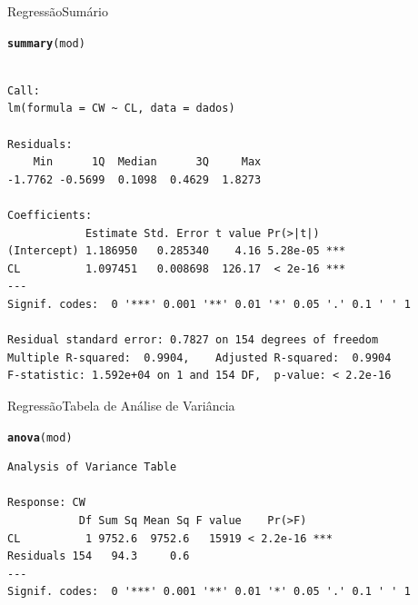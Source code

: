 \documentclass[10pt]{beamer}\usepackage[]{graphicx}\usepackage[]{color}
\makeatletter
\newcommand{\hlstd}[1]{\textcolor[rgb]{0.345,0.345,0.345}{#1}}%
\newcommand{\hlkwd}[1]{\textcolor[rgb]{0.737,0.353,0.396}{\textbf{#1}}}%
\newenvironment{kframe}{%
 \def\at@end@of@kframe{}%
 \ifinner\ifhmode%
  \def\at@end@of@kframe{\end{minipage}}%
  \begin{minipage}{\columnwidth}%
 \fi\fi%
 \def\FrameCommand##1{\hskip\@totalleftmargin \hskip-\fboxsep
 \colorbox{shadecolor}{##1}\hskip-\fboxsep
     \hskip-\linewidth \hskip-\@totalleftmargin \hskip\columnwidth}%
 \MakeFramed {\advance\hsize-\width
   \@totalleftmargin\z@ \linewidth\hsize
   \@setminipage}}%
 {\par\unskip\endMakeFramed%
 \at@end@of@kframe}
\newenvironment{knitrout}{}{} %
\theoremstyle{definition}
\makeatother
\begin{document}
\begin{frame}[fragile=singleslide]{Regressão}{Sumário}
\begin{knitrout}\footnotesize
{}\color{fgcolor}\begin{kframe}
\begin{alltt}
\hlkwd{summary}\hlstd{(mod)}
\end{alltt}
\begin{verbatim}

Call:
lm(formula = CW ~ CL, data = dados)

Residuals:
    Min      1Q  Median      3Q     Max 
-1.7762 -0.5699  0.1098  0.4629  1.8273 

Coefficients:
            Estimate Std. Error t value Pr(>|t|)    
(Intercept) 1.186950   0.285340    4.16 5.28e-05 ***
CL          1.097451   0.008698  126.17  < 2e-16 ***
---
Signif. codes:  0 '***' 0.001 '**' 0.01 '*' 0.05 '.' 0.1 ' ' 1

Residual standard error: 0.7827 on 154 degrees of freedom
Multiple R-squared:  0.9904,	Adjusted R-squared:  0.9904 
F-statistic: 1.592e+04 on 1 and 154 DF,  p-value: < 2.2e-16
\end{verbatim}
\end{kframe}
\end{knitrout}
\end{frame}

\begin{frame}[fragile=singleslide]{Regressão}{Tabela de Análise de Variância}
\begin{knitrout}\small
{}\color{fgcolor}\begin{kframe}
\begin{alltt}
\hlkwd{anova}\hlstd{(mod)}
\end{alltt}
\begin{verbatim}
Analysis of Variance Table

Response: CW
           Df Sum Sq Mean Sq F value    Pr(>F)    
CL          1 9752.6  9752.6   15919 < 2.2e-16 ***
Residuals 154   94.3     0.6                      
---
Signif. codes:  0 '***' 0.001 '**' 0.01 '*' 0.05 '.' 0.1 ' ' 1
\end{verbatim}
\end{kframe}
\end{knitrout}
\end{frame}
\end{document}
